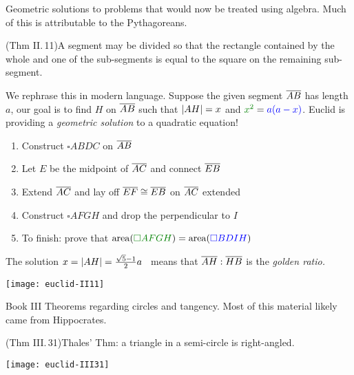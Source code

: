 \begin{description}
	\item[Book II]\lstsp Geometric solutions to problems that would now be treated using algebra. Much of this is attributable to the Pythagoreans.\par
	(Thm II.\,11)\lstsp A segment may be divided so that the rectangle contained by the whole and one of the sub-segments is equal to the square on the remaining sub-segment.\par
	We rephrase this in modern language. Suppose the given segment $\overline{AB}$ has length $a$, our goal is to find $H$ on $\overline{AB}$ such that $\left| AH\right|=x$ and $\textcolor{Green}{x^2}=\textcolor{blue}{a(a-x)}$. Euclid is providing a \emph{geometric solution} to a quadratic equation!\par
	\begin{minipage}[t]{0.69\linewidth}\vspace{-8pt}
		\begin{enumerate}\itemsep2pt
		  \item Construct $\square ABDC$ on $\overline{AB}$
			\item Let $E$ be the midpoint of $\overline{AC}$ and connect $\overline{EB}$
			\item Extend $\overline{AC}$ and lay off $\overline{EF}\cong\overline{EB}$ on $\overline{AC}$ extended
			\item Construct $\square AFGH$ and drop the perpendicular to $I$
			\item To finish: prove that $\operatorname{area}(\textcolor{Green}{\square AFGH}) =\operatorname{area}(\textcolor{blue}{\square BDIH})$
		\end{enumerate}
		The solution $x=\left| AH\right|=\frac{\sqrt 5-1}2a$ \, means that $\overline{AH}:\overline{HB}$ is the \emph{golden ratio.}
	\end{minipage}
	\hfill
	\begin{minipage}[t]{0.3\linewidth}\vspace{-10pt}
		\flushright
		\texttt{[image: euclid-II11]}
	\end{minipage}
	\medbreak



	\begin{minipage}[t]{0.74\linewidth}\vspace{0pt}
		\item[Book III]\lstsp Theorems regarding circles and tangency. Most of this material likely came from Hippocrates.\label{pg:thalesthm}\par
		  (Thm III.\,31)\lstsp Thales' Thm: a triangle in a semi-circle is right-angled.  
	\end{minipage}
	\hfill
	\begin{minipage}[t]{0.25\linewidth}\vspace{0pt}
		\flushright
		\texttt{[image: euclid-III31]}
	\end{minipage}\par



\end{description}
